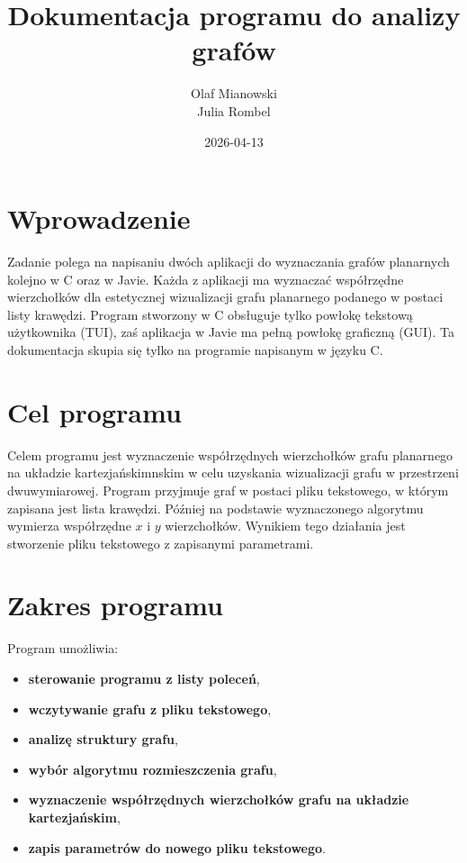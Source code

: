 \documentclass[11pt,a4paper]{article}
\title{Dokumentacja programu do analizy grafów}
\author{Olaf Mianowski \\ Julia Rombel}
\date{2026-04-13}
\begin{document}
\maketitle

\newpage

\tableofcontents

\newpage

\section{Wprowadzenie}
Zadanie polega na napisaniu dwóch aplikacji do wyznaczania grafów planarnych kolejno w C oraz w Javie. Każda z aplikacji ma wyznaczać współrzędne wierzchołków dla estetycznej wizualizacji grafu planarnego podanego w postaci listy krawędzi. Program stworzony w C obsługuje tylko powłokę tekstową użytkownika (TUI), zaś aplikacja w Javie ma pełną powłokę graficzną (GUI). Ta dokumentacja skupia się tylko na programie napisanym w języku C.

\section{Cel programu}
Celem programu jest wyznaczenie współrzędnych wierzchołków grafu planarnego na układzie kartezjańskimnskim w celu uzyskania wizualizacji grafu w przestrzeni dwuwymiarowej. Program przyjmuje graf w postaci pliku tekstowego, w którym zapisana jest lista krawędzi. Później na podstawie wyznaczonego algorytmu wymierza współrzędne $x$ i $y$ wierzchołków. Wynikiem tego działania jest stworzenie pliku tekstowego z zapisanymi parametrami.

\section{Zakres programu}
Program umożliwia:

\begin{itemize}
\item \textbf{sterowanie programu z listy poleceń},
\item \textbf{wczytywanie grafu z pliku tekstowego},
\item \textbf{analizę struktury grafu},
\item \textbf{wybór algorytmu rozmieszczenia grafu},
\item \textbf{wyznaczenie współrzędnych wierzchołków grafu na układzie kartezjańskim},
\item \textbf{zapis parametrów do nowego pliku tekstowego}.
\end{itemize}
\end{document}
